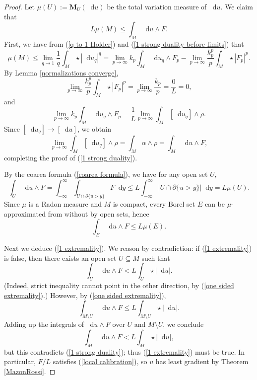 \documentclass[reqno,11pt]{amsart}
\newcommand*\dif{\mathop{}\!\mathrm{d}}
\newcommand{\Mass}{\mathbf M}
\theoremstyle{definition}
\numberwithin{equation}{section}
\begin{document}
\begin{proof}
Let $\mu(U) := \Mass_U(\dif u)$ be the total variation measure of $\dif u$.
We claim that
\begin{equation}\label{1 strong duality}
	L\mu(M) \leq \int_M \dif u \wedge F.
\end{equation}
First, we have from (\ref{q to 1 Holder}) and (\ref{1 strong duality before limits}) that
$$\mu(M) \leq \lim_{q \to 1} \frac{1}{q} \int_M \star |\dif u_q|^q = \lim_{p \to \infty} k_p \int_M \dif u_q \wedge F_p - \lim_{p \to \infty} \frac{k_p^p}{p} \int_M \star |F_p|^p.$$
By Lemma \ref{normalizations converge},
$$\lim_{p \to \infty} \frac{k_p^p}{p} \int_M \star |F_p|^p = \lim_{p \to \infty} \frac{k_p}{p} = \frac{0}{L} = 0,$$
and
$$\lim_{p \to \infty} k_p \int_M \dif u_q \wedge F_p = \frac{1}{L} \lim_{p \to \infty} \int_M [\dif u_q] \wedge \rho.$$
Since $[\dif u_q] \to [\dif u]$, we obtain
$$\lim_{p \to \infty} \int_M [\dif u_q] \wedge \rho = \int_M \alpha \wedge \rho = \int_M \dif u \wedge F,$$
completing the proof of (\ref{1 strong duality}).

By the coarea formula (\ref{coarea formula}), we have for any open set $U$,
$$\int_U \dif u \wedge F = \int_{-\infty}^\infty \int_{U \cap \partial \{u > y\}} F \dif y \leq L \int_{-\infty}^\infty |U \cap \partial \{u > y\}| \dif y = L \mu(U).$$
Since $\mu$ is a Radon measure and $M$ is compact, every Borel set $E$ can be $\mu$-approximated from without by open sets, hence
\begin{equation}\label{one sided extremality}
\int_E \dif u \wedge F \leq L \mu(E).
\end{equation}

Next we deduce (\ref{1 extremality}).
We reason by contradiction: if (\ref{1 extremality}) is false, then there exists an open set $U \subseteq M$ such that 
$$\int_U \dif u \wedge F < L \int_U \star |\dif u|.$$
(Indeed, strict inequality cannot point in the other direction, by (\ref{one sided extremality}).)
However, by (\ref{one sided extremality}), 
$$\int_{M \setminus U} \dif u \wedge F \leq L \int_{M \setminus U} \star |\dif u|.$$
Adding up the integrals of $\dif u \wedge F$ over $U$ and $M \setminus U$, we conclude 
$$\int_M \dif u \wedge F < L \int_M \star |\dif u|,$$
but this contradicts (\ref{1 strong duality}); thus (\ref{1 extremality}) must be true.
In particular, $F/L$ satisfies (\ref{local calibration}), so $u$ has least gradient by Theorem \ref{MazonRossi}.
\end{proof}




\end{document}
